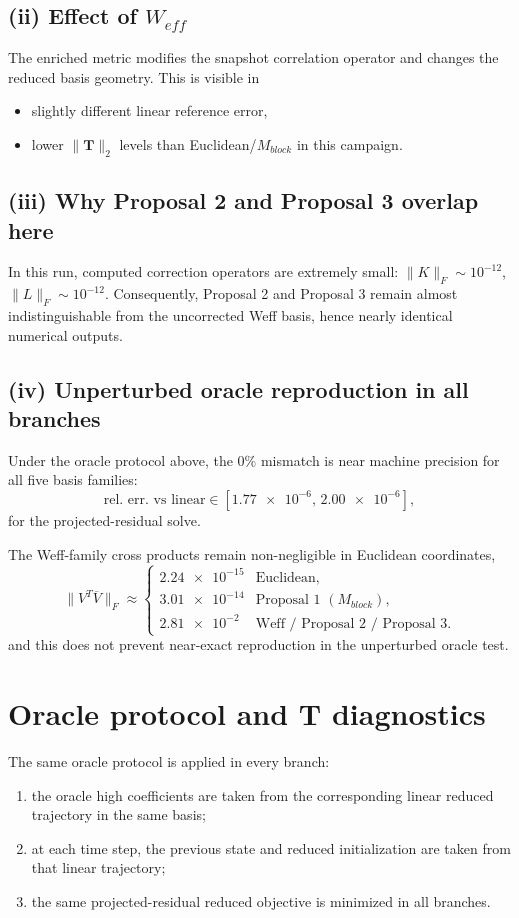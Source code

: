 \documentclass[11pt]{article}
\begin{document}
\subsection*{(ii) Effect of \(W_{eff}\)}
The enriched metric modifies the snapshot correlation operator and changes the reduced basis geometry.
This is visible in
\begin{itemize}[leftmargin=1.5em]
\item slightly different linear reference error,
\item lower \(\|\mathbf T\|_2\) levels than Euclidean/\(M_{block}\) in this campaign.
\end{itemize}

\subsection*{(iii) Why Proposal 2 and Proposal 3 overlap here}
In this run, computed correction operators are extremely small:
\(\|K\|_F\sim 10^{-12}\), \(\|L\|_F\sim 10^{-12}\).
Consequently, Proposal 2 and Proposal 3 remain almost indistinguishable from the uncorrected Weff basis, hence nearly identical numerical outputs.

\subsection*{(iv) Unperturbed oracle reproduction in all branches}
Under the oracle protocol above, the \(0\%\) mismatch is near machine precision for all five basis families:
\[
\text{rel. err. vs linear} \in [\num{1.77e-6},\,\num{2.00e-6}],
\]
for the projected-residual solve.

The Weff-family cross products remain non-negligible in Euclidean coordinates,
\[
\|V^T\overline V\|_F
\approx
\begin{cases}
\num{2.24e-15} & \text{Euclidean},\\
\num{3.01e-14} & \text{Proposal 1 }(M_{block}),\\
\num{2.81e-2} & \text{Weff / Proposal 2 / Proposal 3}.
\end{cases}
\]
and this does not prevent near-exact reproduction in the unperturbed oracle test.

\section{Oracle protocol and \texorpdfstring{\(\mathbf T\)}{T} diagnostics}
The same oracle protocol is applied in every branch:
\begin{enumerate}[leftmargin=1.5em]
\item the oracle high coefficients are taken from the corresponding linear reduced trajectory in the same basis;
\item at each time step, the previous state and reduced initialization are taken from that linear trajectory;
\item the same projected-residual reduced objective is minimized in all branches.
\end{enumerate}
\end{document}
